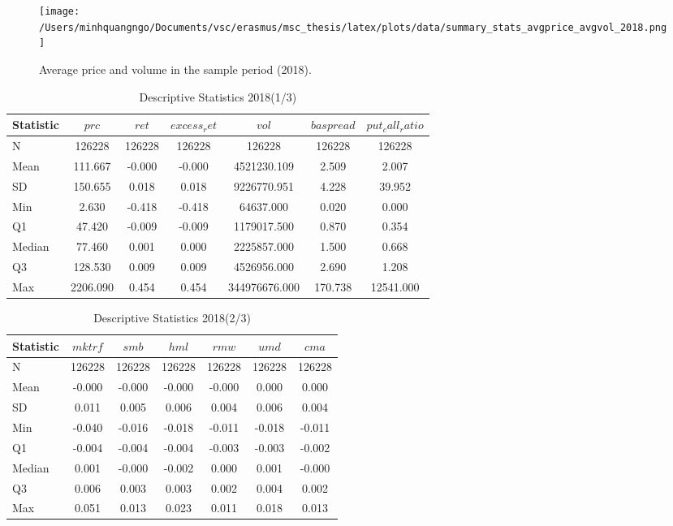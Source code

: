 \begin{figure}[H]
     \centering
     \texttt{[image: /Users/minhquangngo/Documents/vsc/erasmus/msc\_thesis/latex/plots/data/summary\_stats\_avgprice\_avgvol\_2018.png]}
     \caption{Average price and volume in the sample period (2018).}
     \label{fig:avgprice_avgvol_2018}
 \end{figure}

 \begin{table}[ht]
    \centering
    \caption{Descriptive Statistics 2018(1/3)}
    \label{tab:descr_stats_2018_1}
    
    \begin{tabular}{lcccccc}
    \toprule
    Statistic & $prc$ & $ret$ & $excess_ret$ & $vol$ & $baspread$ & $put_call_ratio$ \\\midrule
    N & 126228 & 126228 & 126228 & 126228 & 126228 & 126228 \\
    Mean & 111.667 & -0.000 & -0.000 & 4521230.109 & 2.509 & 2.007 \\
    SD & 150.655 & 0.018 & 0.018 & 9226770.951 & 4.228 & 39.952 \\
    Min & 2.630 & -0.418 & -0.418 & 64637.000 & 0.020 & 0.000 \\
    Q1 & 47.420 & -0.009 & -0.009 & 1179017.500 & 0.870 & 0.354 \\
    Median & 77.460 & 0.001 & 0.000 & 2225857.000 & 1.500 & 0.668 \\
    Q3 & 128.530 & 0.009 & 0.009 & 4526956.000 & 2.690 & 1.208 \\
    Max & 2206.090 & 0.454 & 0.454 & 344976676.000 & 170.738 & 12541.000 \\
    \bottomrule
    \end{tabular}
    \end{table}
    
    \begin{table}[ht]
    \centering
    \caption{Descriptive Statistics 2018(2/3)}
    \label{tab:descr_stats_2018_2}
    
    \begin{tabular}{lcccccc}
    \toprule
    Statistic & $mktrf$ & $smb$ & $hml$ & $rmw$ & $umd$ & $cma$ \\\midrule
    N & 126228 & 126228 & 126228 & 126228 & 126228 & 126228 \\
    Mean & -0.000 & -0.000 & -0.000 & -0.000 & 0.000 & 0.000 \\
    SD & 0.011 & 0.005 & 0.006 & 0.004 & 0.006 & 0.004 \\
    Min & -0.040 & -0.016 & -0.018 & -0.011 & -0.018 & -0.011 \\
    Q1 & -0.004 & -0.004 & -0.004 & -0.003 & -0.003 & -0.002 \\
    Median & 0.001 & -0.000 & -0.002 & 0.000 & 0.001 & -0.000 \\
    Q3 & 0.006 & 0.003 & 0.003 & 0.002 & 0.004 & 0.002 \\
    Max & 0.051 & 0.013 & 0.023 & 0.011 & 0.018 & 0.013 \\
    \bottomrule
    \end{tabular}
    \end{table}
    
